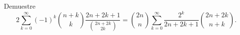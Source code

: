 Demuestre
\[2\sum_{k=0}^\infty (-1)^k \binom{n+k}{k} \frac{2n+2k+1}{\binom{2n+2k}{2k}}
  = \binom{2n}{n}\sum_{k=0}^\infty \frac{2^k}{2n+2k+1}\binom{2n+2k}{n+k}.\]
